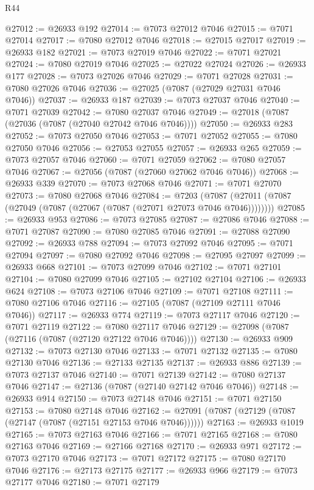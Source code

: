 \begin{lexlean}{R44}
\begin{coremodule}
{@27012 := @26933 @192
@27014 := @7073 @27012 @7046
@27015 := @7071 @27014
@27017 := @7080 @27012 @7046
@27018 := @27015 @27017
@27019 := @26933 @182
@27021 := @7073 @27019 @7046
@27022 := @7071 @27021
@27024 := @7080 @27019 @7046
@27025 := @27022 @27024
@27026 := @26933 @177
@27028 := @7073 @27026 @7046
@27029 := @7071 @27028
@27031 := @7080 @27026 @7046
@27036 := @27025 (@7087 (@27029 @27031 @7046 @7046))
@27037 := @26933 @187
@27039 := @7073 @27037 @7046
@27040 := @7071 @27039
@27042 := @7080 @27037 @7046
@27049 := @27018 (@7087 (@27036 (@7087 (@27040 @27042 @7046 @7046))))
@27050 := @26933 @283
@27052 := @7073 @27050 @7046
@27053 := @7071 @27052
@27055 := @7080 @27050 @7046
@27056 := @27053 @27055
@27057 := @26933 @265
@27059 := @7073 @27057 @7046
@27060 := @7071 @27059
@27062 := @7080 @27057 @7046
@27067 := @27056 (@7087 (@27060 @27062 @7046 @7046))
@27068 := @26933 @339
@27070 := @7073 @27068 @7046
@27071 := @7071 @27070
@27073 := @7080 @27068 @7046
@27084 := @7203
    (@7087 (@27011 (@7087 (@27049 (@7087 (@27067 (@7087 (@27071 @27073 @7046 @7046))))))))
@27085 := @26933 @953
@27086 := @7073 @27085
@27087 := @27086 @7046
@27088 := @7071 @27087
@27090 := @7080 @27085 @7046
@27091 := @27088 @27090
@27092 := @26933 @788
@27094 := @7073 @27092 @7046
@27095 := @7071 @27094
@27097 := @7080 @27092 @7046
@27098 := @27095 @27097
@27099 := @26933 @668
@27101 := @7073 @27099 @7046
@27102 := @7071 @27101
@27104 := @7080 @27099 @7046
@27105 := @27102 @27104
@27106 := @26933 @624
@27108 := @7073 @27106 @7046
@27109 := @7071 @27108
@27111 := @7080 @27106 @7046
@27116 := @27105 (@7087 (@27109 @27111 @7046 @7046))
@27117 := @26933 @774
@27119 := @7073 @27117 @7046
@27120 := @7071 @27119
@27122 := @7080 @27117 @7046
@27129 := @27098 (@7087 (@27116 (@7087 (@27120 @27122 @7046 @7046))))
@27130 := @26933 @909
@27132 := @7073 @27130 @7046
@27133 := @7071 @27132
@27135 := @7080 @27130 @7046
@27136 := @27133 @27135
@27137 := @26933 @886
@27139 := @7073 @27137 @7046
@27140 := @7071 @27139
@27142 := @7080 @27137 @7046
@27147 := @27136 (@7087 (@27140 @27142 @7046 @7046))
@27148 := @26933 @914
@27150 := @7073 @27148 @7046
@27151 := @7071 @27150
@27153 := @7080 @27148 @7046
@27162 := @27091 (@7087 (@27129 (@7087 (@27147 (@7087 (@27151 @27153 @7046 @7046))))))
@27163 := @26933 @1019
@27165 := @7073 @27163 @7046
@27166 := @7071 @27165
@27168 := @7080 @27163 @7046
@27169 := @27166 @27168
@27170 := @26933 @971
@27172 := @7073 @27170 @7046
@27173 := @7071 @27172
@27175 := @7080 @27170 @7046
@27176 := @27173 @27175
@27177 := @26933 @966
@27179 := @7073 @27177 @7046
@27180 := @7071 @27179
}
\end{coremodule}
\end{lexlean}
